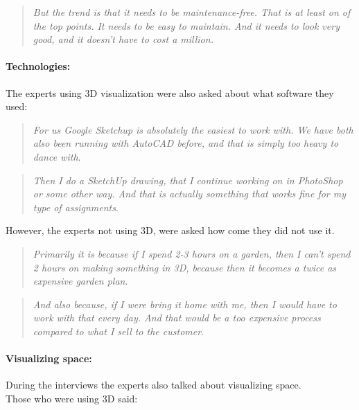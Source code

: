 		\begin{quote}
			\textit{But the trend is that it needs to be maintenance-free. That is at least on of the top points. It needs to be easy to maintain. And it needs to look very good, and it doesn't have to cost a million.}\label{quote:expertDesign4}\\
		\end{quote}
		
		\paragraph*{Technologies:}
		The experts using 3D visualization were also asked about what software they used:\\
		
		\begin{quote}
			\textit{For us Google Sketchup is absolutely the easiest to work with. We have both also been running with AutoCAD before, and that is simply too heavy to dance with}\label{quote:expertTech1}.\\
		\end{quote}
	
		\begin{quote}
			\textit{Then I do a SketchUp drawing, that I continue working on in PhotoShop or some other way. And that is actually something that works fine for my type of assignments}\label{quote:expertTech2}.\\
		\end{quote}
		
		However, the experts not using 3D, were asked how come they did not use it.\\
		
		\begin{quote}
			\textit{Primarily it is because if I spend 2-3 hours on a garden, then I can't spend 2 hours on making something in 3D, because then it becomes a twice as expensive garden plan}\label{quote:expertTech3}.\\
		\end{quote}
		
		\begin{quote}
			\textit{And also because, if I were bring it home with me, then I would have to work with that every day. And that would be a too expensive process compared to what I sell to the customer}\label{quote:expertTech4}.\\
		\end{quote}
		
		\paragraph*{Visualizing space:}
		During the interviews the experts also talked about visualizing space.\\
		Those who were using 3D said:\\
		
